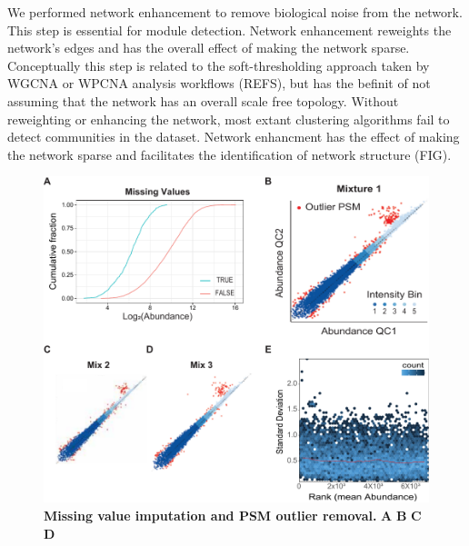 \documentclass[11pt]{elife}\usepackage[]{graphicx}\usepackage[]{color}
\begin{document}
We performed network enhancement to remove biological noise from the network.
This step is essential for module detection. Network enhancement reweights the
network's edges and has the overall effect of making the network sparse.
Conceptually this step is related to the soft-thresholding approach taken by 
WGCNA or WPCNA analysis workflows (REFS), but has the befinit of not assuming
that the network has an overall scale free topology. 
Without reweighting or enhancing the network, most extant clustering 
algorithms fail to detect communities in the dataset. 
Network enhancment has the effect of making the
network sparse and facilitates the identification of network structure (FIG).\\

\begin{figure}[h] %
  \begin{fullwidth}
  \begin{center}
	  \includegraphics[width=0.9\paperwidth,keepaspectratio]{impute}
	  \caption{\textbf{Missing value imputation and PSM outlier removal.}
	  \textbf{A} \textbf{B} \textbf{C} \textbf{D} }
	  \label{fig:impute}
  \end{center}
  \end{fullwidth}
\end{figure}
\end{document}
